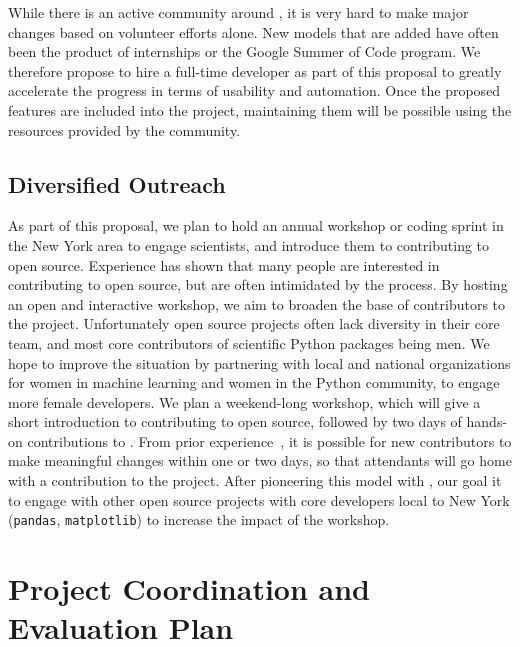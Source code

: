 While there is an active community around \sklearn{}, it is very hard to make
major changes based on volunteer efforts alone. New models that are added have
often been the product of internships or the Google Summer of Code program.  We
therefore propose to hire a full-time developer as part of this proposal to
greatly accelerate the progress in terms of usability and automation. Once
the proposed features are included into the project, maintaining them will be
possible using the resources provided by the community. 

\subsection{Diversified Outreach}
As part of this proposal, we plan to hold an annual workshop or coding sprint
in the New York area to engage scientists, and introduce them to contributing
to open source. Experience has shown that many people are interested
in contributing to open source, but are often intimidated by the process.
By hosting an open and interactive workshop, we aim to broaden the base
of contributors to the \sklearn{} project.
Unfortunately open source projects often lack diversity in their core team,
and most core contributors of scientific Python packages being men.
We hope to improve the situation by partnering with local and national
organizations for women in machine learning and women in the Python community,
to engage more female developers.
We plan a weekend-long workshop, which will give a short introduction to
contributing to open source, followed by two days of hands-on contributions to
\sklearn{}.
From prior experience~\autocite{meetupsprintSF}, it is possible for new
contributors to make meaningful changes within one or two days, so that
attendants will go home with a contribution to the project. After pioneering
this model with \sklearn{}, our goal it to engage with other open source
projects with core developers local to New York (\texttt{pandas},
\texttt{matplotlib}) to increase the impact of the workshop.

\section{Project Coordination and Evaluation Plan}
